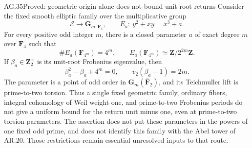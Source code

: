 \begin{claim}{AG.35}{Proved: geometric origin alone does not bound unit-root returns}
Consider the fixed smooth elliptic family over the multiplicative group
\[
 \mathcal E\longrightarrow\mathbf G_{m,\mathbf F_4},
 \qquad E_a:\ y^2+xy=x^3+a.                         \tag{AG.35.1}
\]
For every positive odd integer $m$, there is a closed parameter $a$
of exact degree $m$ over $\mathbf F_4$ such that
\[
 \#E_a(\mathbf F_{4^m})=4^m,
 \qquad E_a(\mathbf F_{4^m})\simeq\mathbf Z/2^{2m}\mathbf Z.
                                                        \tag{AG.35.2}
\]
If $\beta_a\in\mathbf Z_2^\times$ is its unit-root Frobenius
eigenvalue, then
\[
 \beta_a^2-\beta_a+4^m=0,
 \qquad v_2(\beta_a-1)=2m.                         \tag{AG.35.3}
\]
The parameter is a point of odd order in
$\mathbf G_m(\overline{\mathbf F}_2)$, and its Teichmuller lift
is prime-to-two torsion. Thus a single fixed geometric family,
ordinary fibers, integral cohomology of Weil weight one, and
prime-to-two Frobenius periods do not give a uniform bound for
the return unit minus one, even at prime-to-two torsion parameters.
The assertion does not put these parameters in the powers of one
fixed odd prime, and does not identify this family with the Abel
tower of AR.20. Those restrictions remain essential unresolved
inputs to that route.
\end{claim}
